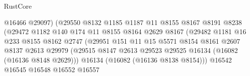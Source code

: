\begin{lexlean}{RustCore}
\begin{coremodule}
                                        @16466
                                        @29097)
                                      (@29550
                                        @8132
                                        @1185
                                        @1187
                                        @11
                                        @8155
                                        @8167
                                        @8191
                                        @8238
                                        (@29472
                                          @1182
                                          @140
                                          @174
                                          @11
                                          @8155
                                          @8164
                                          @2629
                                          @8167
                                          (@29482
                                            @1181
                                            @16
                                            @233
                                            @8155
                                            @8162
                                            @2747
                                            (@29951
                                              @151
                                              @11
                                              @15
                                              @5571
                                              @8154
                                              @8161
                                              @2607
                                              @8137
                                              @2613
                                              @29979
                                              (@29515
                                                @8147
                                                @2613
                                                @29523
                                                @29525
                                                @16134
                                                (@16082 (@16136 @8148 @2629)))
                                              @16134
                                              (@16082 (@16136 @8138 @8154)))
                                            @16542
                                            @16545
                                            @16548
                                            @16552
                                            @16557

\end{coremodule}
\end{lexlean}
